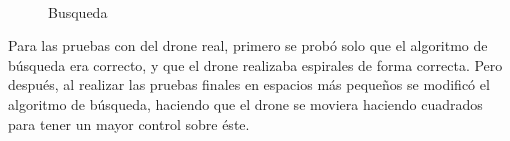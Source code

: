\begin{figure}[H]
 \centering
	\\
 \caption{Busqueda}
 \label{f:Busqueda sobre el simulador}
\end{figure}


\hspace{1cm} Para las pruebas con del drone real, primero se prob\'o solo que el algoritmo de b\'usqueda era correcto, y que el drone realizaba espirales de forma correcta. Pero despu\'es, al realizar las pruebas finales en espacios m\'as pequeños se modific\'o el algoritmo de b\'usqueda, haciendo que el drone se moviera haciendo cuadrados para tener un mayor control sobre \'este. 

